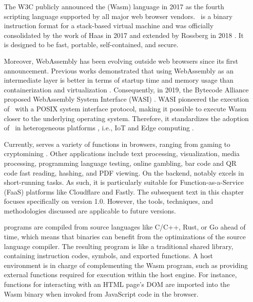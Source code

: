 \msection{\Wasm}
\label{sota:wasm}
The W3C publicly announced the \Wasm(Wasm) language in 2017 as the fourth scripting language supported by all major web browser vendors.
\Wasm\ is a binary instruction format for a stack-based virtual machine and was officially consolidated by the work of Haas \etal \cite{Haas_2017} in 2017 and extended by Rossberg \etal in 2018 \cite{10.1145/3282510}. 
It is designed to be fast, portable, self-contained, and secure.


Moreover, WebAssembly has been evolving outside web browsers since its first announcement.
Previous works demonstrated that using WebAssembly as an intermediate layer is better in terms of startup time and memory usage than containerization and virtualization \cite{pMendkiServerless, 1244493Jacobsson}. 
Consequently, in 2019, the Bytecode Alliance proposed WebAssembly System Interface (WASI) \cite{WASI}. 
WASI pioneered the execution of \Wasm\ with a POSIX system interface protocol, making it possible to execute Wasm closer to the underlying operating system. 
Therefore, it standardizes the adoption of \Wasm\ in heterogeneous platforms \cite{bryant2020webassembly}, i.e., IoT and Edge computing \cite{9640153, wen2020wasmachine}.

Currently, \Wasm serves a variety of functions in browsers, ranging from gaming to cryptomining \cite{Hilbig2021AnES}. 
Other applications include text processing, visualization, media processing, programming language testing, online gambling, bar code and QR code fast reading, hashing, and PDF viewing. 
On the backend, \Wasm notably excels in short-running tasks. 
As such, it is particularly suitable for Function-as-a-Service (FaaS) platforms like Cloudflare and Fastly.
The subsequent text in this chapter focuses specifically on \Wasm version 1.0. 
However, the tools, techniques, and methodologies discussed are applicable to future \Wasm versions.



\Wasm programs are compiled from source languages like C/C++, Rust, or Go ahead of time, which means that \wasm binaries can benefit from the optimizations of the source language compiler.
The resulting \Wasm program is like a traditional shared library, containing instruction codes, symbols, and exported functions. 
A host environment is in charge of complementing the Wasm program, such as providing external functions required for execution within the host engine. 
For instance, functions for interacting with an HTML page's DOM are imported into the Wasm binary when invoked from JavaScript code in the browser. 

